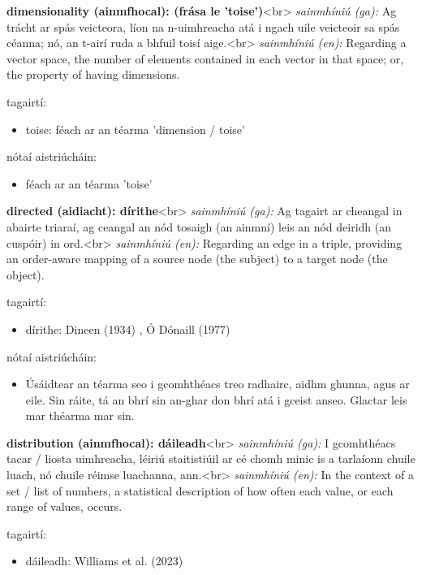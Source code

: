 \documentclass{article}
\begin{document}
\textbf{dimensionality (ainmfhocal): (frása le 'toise')}<br>
\textit{sainmhíniú (ga):} Ag trácht ar spás veicteora, líon na n-uimhreacha atá i ngach uile veicteoir sa spás céanna; nó, an t-airí ruda a bhfuil toisí aige.<br>
\textit{sainmhíniú (en):} Regarding a vector space, the number of elements contained in each vector in that space; or, the property of having dimensions.

tagairtí:
\begin{itemize}
	\item toise: féach ar an téarma 'dimension / toise'
\end{itemize}

nótaí aistriúcháin:
\begin{itemize}
	\item féach ar an téarma 'toise'
\end{itemize}


\textbf{directed (aidiacht): dírithe}<br>
\textit{sainmhíniú (ga):} Ag tagairt ar cheangal in abairte triaraí, ag ceangal an nód tosaigh (an ainmní) leis an nód deiridh (an cuspóir) in ord.<br>
\textit{sainmhíniú (en):} Regarding an edge in a triple, providing an order-aware mapping of a source node (the subject) to a target node (the object).

tagairtí:
\begin{itemize}
	\item dírithe: Dineen (1934) \cite{dineen}, Ó Dónaill (1977) \cite{odonaill}
\end{itemize}

nótaí aistriúcháin:
\begin{itemize}
	\item Úsáidtear an téarma seo i gcomhthéacs treo radhairc, aidhm ghunna, agus ar eile. Sin ráite, tá an bhrí sin an-ghar don bhrí atá i gceist anseo. Glactar leis mar théarma mar sin.
\end{itemize}


\textbf{distribution (ainmfhocal): dáileadh}<br>
\textit{sainmhíniú (ga):} I gcomhthéacs tacar / liosta uimhreacha, léiriú staitistiúil ar cé chomh minic is a tarlaíonn chuile luach, nó chuile réimse luachanna, ann.<br>
\textit{sainmhíniú (en):} In the context of a set / list of numbers, a statistical description of how often each value, or each range of values, occurs.

tagairtí:
\begin{itemize}
	\item dáileadh: Williams et al. (2023) \cite{storchiste}
\end{itemize}
\end{document}
